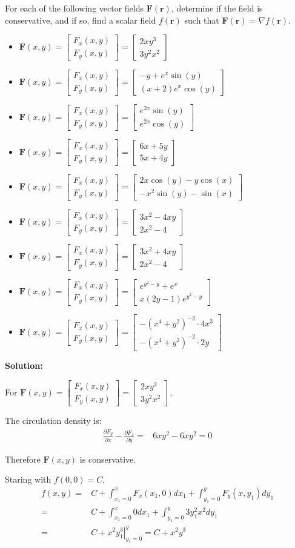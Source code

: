 \documentclass{article}
\newcommand{\colxyvec}[2]{\begin{bmatrix} #1 \\ #2 \end{bmatrix}}
\newcommand{\at}[1]{\left. #1 \right|}
\newcommand{\dr}[1]{\textcolor{dark_red}{#1}}
\begin{document}
For each of the following vector fields \(\mathbf{F}(\mathbf{r})\), determine if the field is conservative, and if so, find a scalar field \(f(\mathbf{r})\) such that \(\mathbf{F}(\mathbf{r}) = \nabla f(\mathbf{r})\). 

 \begin{itemize}
\item \(\mathbf{F}(x,y) = \colxyvec{F_x(x,y)}{F_y(x,y)} = \colxyvec{2xy^3}{3y^2x^2}\) 
\item \(\mathbf{F}(x,y) = \colxyvec{F_x(x,y)}{F_y(x,y)} = \colxyvec{-y + e^x\sin(y)}{(x + 2)e^x\cos(y)}\) 
\item \(\mathbf{F}(x,y) = \colxyvec{F_x(x,y)}{F_y(x,y)} = \colxyvec{e^{2x}\sin(y)}{e^{2x}\cos(y)}\) 
\item \(\mathbf{F}(x,y) = \colxyvec{F_x(x,y)}{F_y(x,y)} = \colxyvec{6x + 5y}{5x + 4y}\) 
\item \(\mathbf{F}(x,y) = \colxyvec{F_x(x,y)}{F_y(x,y)} = \colxyvec{2x\cos(y) - y\cos(x)}{-x^2\sin(y) - \sin(x)}\) 
\item \(\mathbf{F}(x,y) = \colxyvec{F_x(x,y)}{F_y(x,y)} = \colxyvec{3x^2 - 4xy}{2x^2 - 4}\)
\item \(\mathbf{F}(x,y) = \colxyvec{F_x(x,y)}{F_y(x,y)} = \colxyvec{3x^2 + 4xy}{2x^2 - 4}\)
\item \(\mathbf{F}(x,y) = \colxyvec{F_x(x,y)}{F_y(x,y)} = \colxyvec{e^{y^2 - y} + e^x}{x(2y - 1)e^{y^2 - y}}\)
\item \(\mathbf{F}(x,y) = \colxyvec{F_x(x,y)}{F_y(x,y)} = \colxyvec{-(x^4 + y^2)^{-2} \cdot 4x^3}{-(x^4 + y^2)^{-2} \cdot 2y}\)
\end{itemize}

\pagebreak

\dr{\textbf{Solution:}}

\begin{framed}
\dr{For \(\mathbf{F}(x,y) = \colxyvec{F_x(x,y)}{F_y(x,y)} = \colxyvec{2xy^3}{3y^2x^2}\),}

\dr{The circulation density is: 
\begin{align*}
\frac{\partial F_y}{\partial x} - \frac{\partial F_x}{\partial y} = & 6xy^2 - 6xy^2 = 0
\end{align*}}

\dr{Therefore \(\mathbf{F}(x,y)\) is conservative.}

\dr{Staring with \(f(0,0) = C\),
\begin{align*}
f(x,y) = & C + \int_{x_1 = 0}^x F_x(x_1,0)dx_1 + \int_{y_1 = 0}^y F_y(x,y_1)dy_1 \\
= & C + \int_{x_1 = 0}^x 0dx_1 + \int_{y_1 = 0}^y 3y_1^2x^2dy_1 \\
= & C + \at{x^2y_1^3}_{y_1 = 0}^y 
= C + x^2y^3
\end{align*}}

\end{framed}
\end{document}
